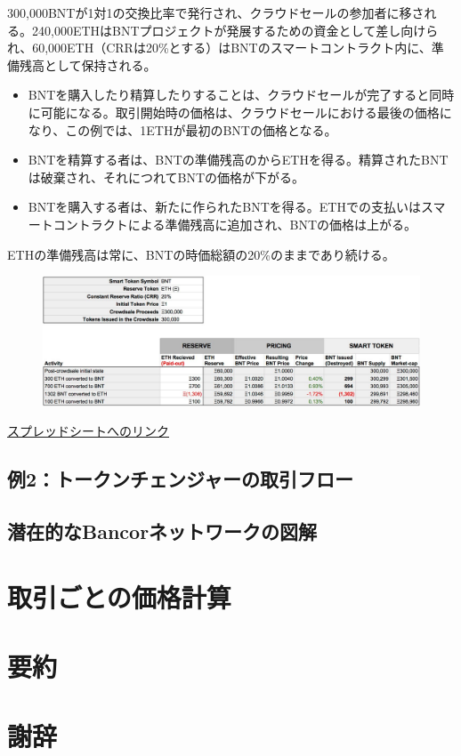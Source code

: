 \documentclass{jsarticle}
\begin{document}
   300,000BNTが1対1の交換比率で発行され、クラウドセールの参加者に移される。240,000ETHはBNTプロジェクトが発展するための資金として差し向けられ、60,000ETH（CRRは20\%とする）はBNTのスマートコントラクト内に、準備残高として保持される。

   \begin{itemize}
    \item BNTを購入したり精算したりすることは、クラウドセールが完了すると同時に可能になる。取引開始時の価格は、クラウドセールにおける最後の価格になり、この例では、1ETHが最初のBNTの価格となる。
    \item BNTを精算する者は、BNTの準備残高のからETHを得る。精算されたBNTは破棄され、それにつれてBNTの価格が下がる。
    \item BNTを購入する者は、新たに作られたBNTを得る。ETHでの支払いはスマートコントラクトによる準備残高に追加され、BNTの価格は上がる。
   \end{itemize}

   ETHの準備残高は常に、BNTの時価総額の20\%のままであり続ける。

   \begin{figure}[h]
    \begin{center}
     \includegraphics[scale=0.3]{fig2.png}
    \end{center}
   \end{figure}

   \href{https://goo.gl/3hR6e8}{スプレッドシートへのリンク}

  \subsection{例2：トークンチェンジャーの取引フロー}


  \subsection{潜在的なBancorネットワークの図解}



\section{取引ごとの価格計算}



\section{要約}



\section{謝辞}
\end{document}
